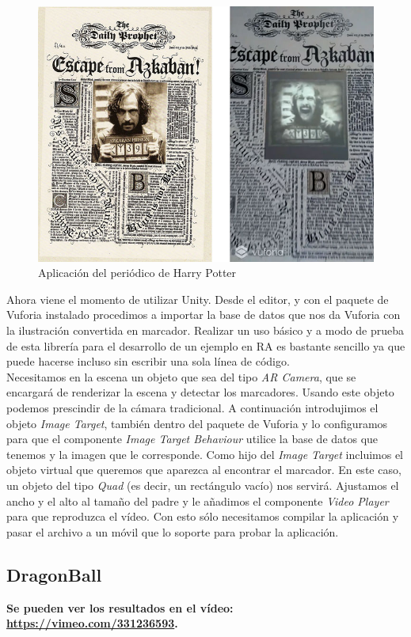 \begin{figure}[H]
    \centering
    \includegraphics[width=0.6\linewidth]{Images/DailyProphetAzkaban.jpg}
    \caption{Aplicación del periódico de Harry Potter}
    \label{Azkaban}
\end{figure}

Ahora viene el momento de utilizar Unity. Desde el editor, y con el paquete de Vuforia instalado procedimos a importar la base de datos que nos da Vuforia con la ilustración convertida en marcador. Realizar un uso básico y a modo de prueba de esta librería para el desarrollo de un ejemplo en RA es bastante sencillo ya que puede hacerse incluso sin escribir una sola línea de código.\\

Necesitamos en la escena un objeto que sea del tipo \textit{AR Camera}, que se encargará de renderizar la escena y detectar los marcadores. Usando este objeto podemos prescindir de la cámara tradicional. A continuación introdujimos el objeto \textit{Image Target}, también dentro del paquete de Vuforia y lo configuramos para que el componente \textit{Image Target Behaviour} utilice la base de datos que tenemos y la imagen que le corresponde. Como hijo del \textit{Image Target} incluimos el objeto virtual que queremos que aparezca al encontrar el marcador. En este caso, un objeto del tipo \textit{Quad} (es decir, un rectángulo vacío) nos servirá. Ajustamos el ancho y el alto al tamaño del padre y le añadimos el componente \textit{Video Player} para que reproduzca el vídeo. Con esto sólo necesitamos compilar la aplicación y pasar el archivo a un móvil que lo soporte para probar la aplicación.\\


\subsection{DragonBall}

\textbf{Se pueden ver los resultados en el vídeo: \url{https://vimeo.com/331236593}.}\\

